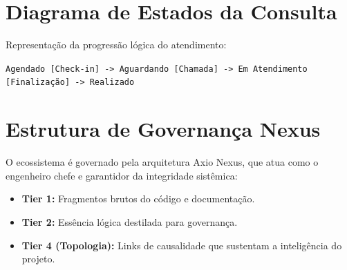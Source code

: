 \section{Diagrama de Estados da Consulta}

Representação da progressão lógica do atendimento:

\texttt{Agendado [Check-in] -> Aguardando [Chamada] -> Em Atendimento [Finalização] -> Realizado}

\section{Estrutura de Governança Nexus}

O ecossistema é governado pela arquitetura Axio Nexus, que atua como o engenheiro chefe e garantidor da integridade sistêmica:
\begin{itemize}
    \item \textbf{Tier 1:} Fragmentos brutos do código e documentação.
    \item \textbf{Tier 2:} Essência lógica destilada para governança.
    \item \textbf{Tier 4 (Topologia):} Links de causalidade que sustentam a inteligência do projeto.
\end{itemize}
